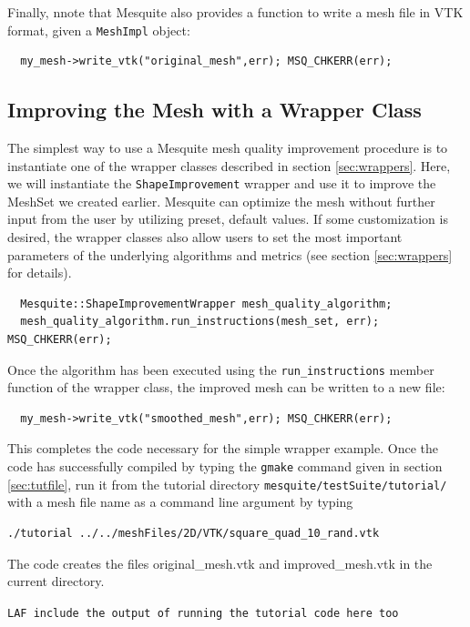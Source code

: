 \documentclass[letter]{report}
\begin{document}
Finally, nnote that Mesquite also provides a function to write a mesh
file in VTK format, given a \texttt{MeshImpl} object:
\begin{verbatim}
  my_mesh->write_vtk("original_mesh",err); MSQ_CHKERR(err);
\end{verbatim}


\subsection{Improving the Mesh with a Wrapper Class}
\label{sec:tutWrapper}
The simplest way to use a Mesquite mesh quality improvement
procedure is to instantiate one of the wrapper classes described in section
\ref{sec:wrappers}. Here, we will instantiate the
\texttt{ShapeImprovement} wrapper and use it to improve 
the MeshSet we created earlier.  Mesquite can optimize the mesh
without further input from the user by utilizing preset, default
values.  If some customization is desired, the wrapper classes also
allow users to set the most important parameters of the underlying
algorithms and metrics (see section
\ref{sec:wrappers} for details).
\begin{verbatim}
  Mesquite::ShapeImprovementWrapper mesh_quality_algorithm;
  mesh_quality_algorithm.run_instructions(mesh_set, err); MSQ_CHKERR(err);
\end{verbatim}
Once the algorithm has been executed using the {\tt run\_instructions} member
function of the wrapper class, the improved mesh can be written to a new
file:
\begin{verbatim}
  my_mesh->write_vtk("smoothed_mesh",err); MSQ_CHKERR(err);
\end{verbatim}
This completes the code necessary for the simple wrapper example.  Once
the code has successfully compiled by typing the {\tt gmake} command given in
section \ref{sec:tutfile}, 
run it from the tutorial directory \texttt{mesquite/testSuite/tutorial/}
with a mesh file name as a command line 
argument by typing 
\begin{verbatim}
./tutorial ../../meshFiles/2D/VTK/square_quad_10_rand.vtk
\end{verbatim}
The code creates the files original\_mesh.vtk
and improved\_mesh.vtk in the current directory. 

{\tt LAF include the output of running the tutorial code here too}
\end{document}

